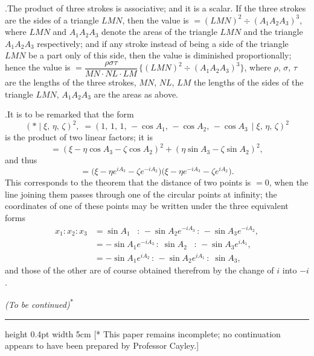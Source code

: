 \documentclass[11pt]{article}
\begin{document}
\medskip

.\quad The product of three strokes is associative; and it is a scalar. If the three strokes are the sides of a triangle $LMN$, then the value is $= (LMN)^{2}\div (A_{1}A_{2}A_{3})^{3}$, where $LMN$ and $A_{1}A_{2}A_{3}$ denote the areas of the triangle $LMN$ and the triangle $A_{1}A_{2}A_{3}$ respectively; and if any stroke instead of being a side of the triangle $LMN$ be a part only of this side, then the value is diminished proportionally; hence the value is $= \dfrac{\rho\sigma\tau}{MN\cdot NL\cdot LM}\,\bigl\{(LMN)^{2} \div (A_{1}A_{2}A_{3})^{3}\bigr\}$, where $\rho$, $\sigma$, $\tau$ are the lengths of the three strokes, $MN$, $NL$, $LM$ the lengths of the sides of the triangle $LMN$, $A_{1}A_{2}A_{3}$ are the areas as above.

\medskip

.\quad It is to be remarked that the form
\[
(*\!\mid\xi,\,\eta,\,\zeta)^{2},\;= (1,\,1,\,1,\,-\cos A_{1},\,-\cos A_{2},\,-\cos A_{3}\,\mid\xi,\,\eta,\,\zeta)^{2}
\]
is the product of two linear factors; it is
\[
= (\xi - \eta\cos A_{3} - \zeta\cos A_{2})^{2} + (\eta\sin A_{3} - \zeta\sin A_{2})^{2},
\]
and thus
\[
= \bigl(\xi - \eta e^{iA_{3}} - \zeta e^{-iA_{2}}\bigr)\bigl(\xi - \eta e^{-iA_{3}} - \zeta e^{iA_{2}}\bigr).
\]
This corresponds to the theorem that the distance of two points is $= 0$, when the line joining them passes through one of the circular points at infinity; the coordinates of one of these points may be written under the three equivalent forms
\begin{align*}
x_{1}:x_{2}:x_{3} &= \sin A_{1}\;\;\;:\,-\sin A_{2}e^{-iA_{3}}\,:\,-\sin A_{3}e^{-iA_{2}}, \\
&= -\sin A_{1}e^{-iA_{3}}\,:\;\sin A_{2}\;\;\;:\,-\sin A_{3}e^{iA_{1}}, \\
&= -\sin A_{1}e^{iA_{2}}\,:\,-\sin A_{2}e^{iA_{1}}\,:\;\sin A_{3},
\end{align*}
and those of the other are of course obtained therefrom by the change of $i$ into $-i$.

\medskip

\begin{center}\textit{(To be continued)}\textsuperscript{*}\end{center}

\vfill

\hrule height 0.4pt width 5cm
\smallskip
\noindent\footnotesize [* This paper remains incomplete; no continuation appears to have been prepared by Professor Cayley.]
\end{document}
